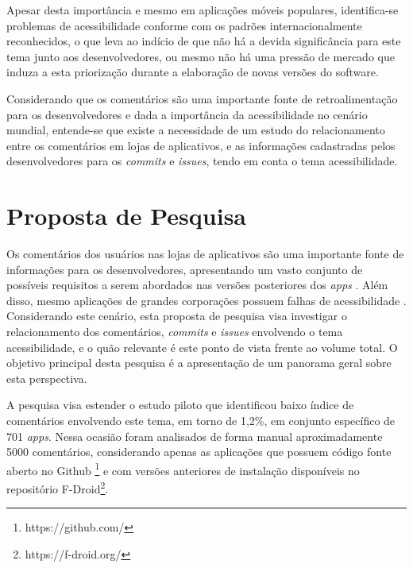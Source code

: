 \documentclass[
	12pt,				%
	oneside,			%
	a4paper,			%
	english,			%
	brazil				%
	]{abntex2ppgsi}
\begin{document}
Apesar desta importância e mesmo em aplicações móveis populares, identifica-se problemas de acessibilidade conforme com os padrões internacionalmente reconhecidos, o que leva ao indício de que não há a devida significância para este tema junto aos desenvolvedores, ou mesmo não há uma pressão de mercado que induza a esta priorização durante a elaboração de novas versões do software.

Considerando que os comentários são uma importante fonte de retroalimentação para os desenvolvedores e dada a importância da acessibilidade no cenário mundial, entende-se que existe a necessidade de um estudo do relacionamento entre os comentários em lojas de aplicativos, e as informações cadastradas pelos desenvolvedores para os \textit{commits} e \textit{issues}, tendo em conta o tema acessibilidade.



\chapter{Proposta de Pesquisa}
%
%

Os comentários dos usuários nas lojas de aplicativos são uma importante fonte de informações para os desenvolvedores, apresentando um vasto conjunto de possíveis requisitos a serem abordados nas versões posteriores dos \textit{apps} \cite{Ciurumelea2017analyzing,Li2018MobileAE,Ortega2015thesis,Palomba2015userreviews,Palompa2018crowdsourcing,Pelloni2018becloma}. Além disso, mesmo aplicações de grandes corporações possuem falhas de acessibilidade \cite{Eler2018mate}. Considerando este cenário, esta proposta de pesquisa visa investigar o relacionamento dos comentários, \textit{commits} e \textit{issues} envolvendo o tema acessibilidade, e o quão relevante é este ponto de vista frente ao volume total. O objetivo principal desta pesquisa é a apresentação de um panorama geral sobre esta perspectiva.

A pesquisa visa estender o estudo piloto \cite{ihc2019} que identificou baixo índice de comentários envolvendo este tema, em torno de 1,2\%, em conjunto específico de 701 \textit{apps}. Nessa ocasião foram analisados de forma manual aproximadamente 5000 comentários, considerando apenas as aplicações que possuem código fonte aberto no Github \footnote{https://github.com/} e com versões anteriores de instalação disponíveis no repositório F-Droid\footnote{https://f-droid.org/}.
\end{document}
